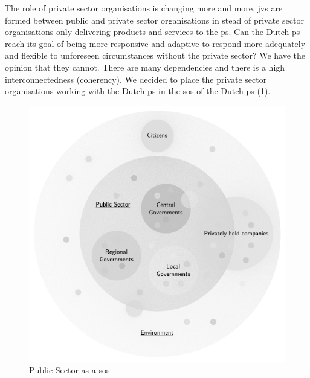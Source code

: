 The role of private sector organisations is changing more and more. \Glspl{jv} are formed between public and private sector organisations in stead of private sector organisations only delivering products and services to the \gls{ps}. Can the Dutch \gls{ps} reach its goal of being more responsive and adaptive to respond more adequately and flexible to unforeseen circumstances without the private sector? We have the opinion that they cannot. There are many dependencies and there is a high interconnectedness (coherency). We decided to place the private sector organisations working with the Dutch \gls{ps} in the \gls{sos} of the Dutch \gls{ps} (\cref{fig:pssystemofsystems}).
\begin{figure}[H]
	\centering
	\includegraphics[width=0.6\linewidth]{images/pssystemofsystems}
	\caption[Public Sector as a \gls{sos}]{Public Sector as a \gls{sos}}
	\label{fig:pssystemofsystems}
\end{figure}

